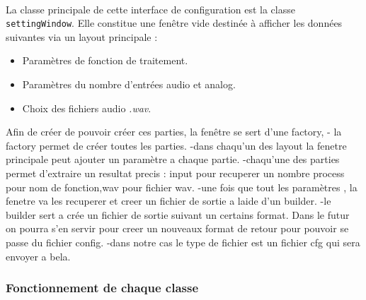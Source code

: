  \paragraph{}
 La classe principale de cette interface de configuration est la
 classe \verb!settingWindow!. Elle constitue une fenêtre vide
 destinée à afficher les données suivantes via un layout principale :
 \begin{itemize}
  \item Paramètres de fonction de traitement.
  \item Paramètres du nombre d'entrées audio et analog.
  \item Choix des fichiers audio \textit{.wav}.
 \end{itemize}
 Afin de créer de pouvoir créer ces parties, la fenêtre se sert d'une factory,
 - la factory permet de créer toutes les parties.
 -dans chaqu'un des layout la fenetre principale peut ajouter un paramètre a chaque
 partie.
 -chaqu'une des parties permet d'extraire un resultat precis : input pour recuperer un nombre
 process pour nom de fonction,wav pour fichier wav.
 -une fois que tout les paramètres , la fenetre va les recuperer et creer un
 fichier de sortie a laide d'un builder.
 -le builder sert a crée un fichier de sortie suivant un certains format. Dans le
 futur on pourra s'en servir pour creer un nouveaux format de retour pour pouvoir
 se passe du fichier config.
 -dans notre cas le type de fichier est un fichier cfg qui sera envoyer a bela.

 \subsubsection{Fonctionnement de chaque classe}
